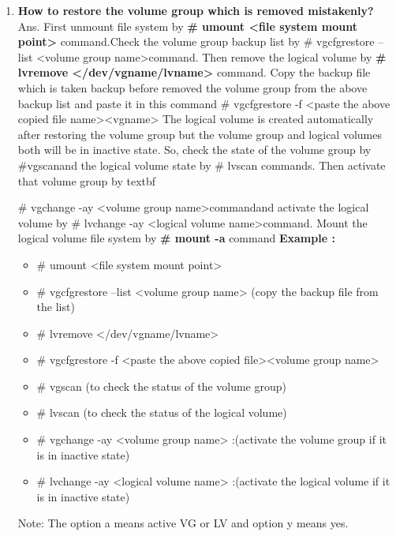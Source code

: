 \begin{enumerate}
\begin{enumerate}
    \item \textbf{How to restore the volume group which is removed mistakenly?}
    \newline
    Ans. First unmount file system by \textbf{# umount   <file system mount point> } command.Check the volume group backup list by # vgcfgrestore    --list   <volume group name>command.
     Then remove the logical volume by \textbf{# lvremove    </dev/vgname/lvname> }command.
     Copy the backup file which is taken backup before removed the volume group from the above backup list and paste it in this command # vgcfgrestore    -f   <paste the above copied file name><vgname>
     The logical volume is created automatically after restoring the volume group but the volume group and logical volumes both will be in inactive state. So, check the state of the volume group by #vgscanand the logical volume state by # lvscan  commands.
     Then activate that volume group by textbf{# vgchange   -ay   <volume group name>commandand activate the logical volume by # lvchange    -ay   <logical volume name>command.
     Mount the logical volume file system by \textbf{# mount   -a}  command
     \textbf{Example : }\begin{itemize}
                           \item # umount    <file system mount point>
                           \item # vgcfgrestore    --list   <volume group name>	(copy the backup file from the list)
                           \item # lvremove    </dev/vgname/lvname>
                           \item# vgcfgrestore    -f   <paste the above copied file><volume group name>
                           \item # vgscan 					(to check the status of the volume group)
                           \item # lvscan						(to check the status of the logical volume)
                           \item# vgchange    -ay   <volume group name>	:(activate the volume group if it is in inactive state)
                           \item# lvchange     -ay   <logical volume name>	:(activate the logical volume if it is in inactive state)
                        \end{itemize}
                        Note:  The option   a   means active VG or LV  and option   y   means  yes.
    
                        
   \bigskip
   \bigskip

}
\end{enumerate}
\end{enumerate}
